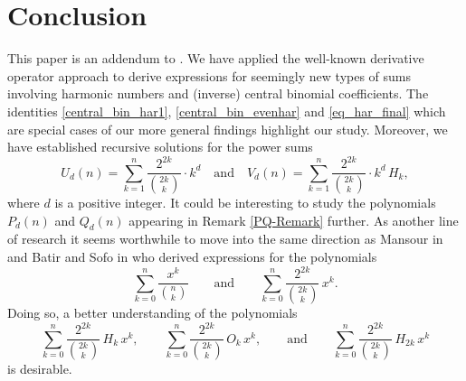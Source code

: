 \documentclass[11pt,reqno]{amsart}
\theoremstyle{plain}
\numberwithin{equation}{section}
\begin{document}
\section{Conclusion}

This paper is an addendum to \cite{Bataille}. We have applied the well-known derivative operator approach to derive expressions 
for seemingly new types of sums involving harmonic numbers and (inverse) central binomial coefficients. 
The identities \eqref{central_bin_har1}, \eqref{central_bin_evenhar} and \eqref{eq_har_final} which are special cases of our more general findings highlight our study. Moreover, we have established recursive solutions for the power sums
\begin{equation*}
U_d(n) = \sum_{k=1}^n \frac{2^{2k}}{\binom{2k}{k}} \cdot k^d \quad \mbox{and}\quad  
V_d(n) = \sum_{k=1}^n \frac{2^{2k}}{\binom{2k}{k}}\cdot k^d\,H_k,
\end{equation*}
where $d$ is a positive integer. It could be interesting to study the polynomials $P_d(n)$ and $Q_d(n)$ appearing in 
Remark \ref{PQ-Remark} further. As another line of research it seems worthwhile to move into the same direction as 
Mansour in \cite{Mansour} and Batir and Sofo in \cite{Batir2} who derived expressions for the polynomials
\begin{equation*}
\sum_{k=0}^n \frac{x^k}{\binom{n}{k}} \qquad \mbox{and}\qquad  \sum_{k=0}^n \frac{2^{2k}}{\binom{2k}{k}}\,x^k.
\end{equation*}
Doing so, a better understanding of the polynomials
\begin{equation*}
\sum_{k=0}^n \frac{2^{2k}}{\binom{2k}{k}}\,H_k\,x^k,  \qquad \sum_{k=0}^n \frac{2^{2k}}{\binom{2k}{k}}\,O_k\,x^k, \qquad\mbox{and}\qquad  
\sum_{k=0}^n \frac{2^{2k}}{\binom{2k}{k}}\,H_{2k}\,x^k
\end{equation*}
is desirable.

\end{document}
